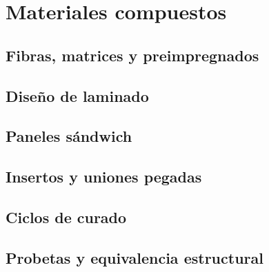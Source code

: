 \chapter{Materiales compuestos}
\label{ch:materiales_compuestos}

\begin{objetivos}
  \item {}
  \item {}
  \item {}
\end{objetivos}


\section{Fibras, matrices y preimpregnados}
\label{sec:materiales_compuestos:01}

\section{Diseño de laminado}
\label{sec:materiales_compuestos:02}

\section{Paneles sándwich}
\label{sec:materiales_compuestos:03}

\section{Insertos y uniones pegadas}
\label{sec:materiales_compuestos:04}

\section{Ciclos de curado}
\label{sec:materiales_compuestos:05}

\section{Probetas y equivalencia estructural}
\label{sec:materiales_compuestos:06}

